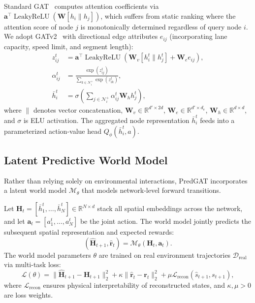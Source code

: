 \documentclass[11pt,a4paper]{article}
\begin{document}
Standard GAT~\cite{velickovic2018graph} computes attention coefficients via $\mathbf{a}^\top \operatorname{LeakyReLU}(\mathbf{W}[h_i \| h_j])$, which suffers from static ranking where the attention score of node $j$ is monotonically determined regardless of query node $i$. We adopt GATv2~\cite{brody2022gatv2} with directional edge attributes $e_{ij}$ (incorporating lane capacity, speed limit, and segment length):
\begin{align}
    z_{ij}^t &= \mathbf{a}^\top \operatorname{LeakyReLU}\left( \mathbf{W}_v [h_i^t \parallel h_j^t] + \mathbf{W}_e e_{ij} \right), \\
    \alpha_{ij}^t &= \frac{\exp(z_{ij}^t)}{\sum_{k \in \mathcal{N}_i^+} \exp(z_{ik}^t)}, \\
    \bar{h}_i^t &= \sigma\left( \sum_{j \in \mathcal{N}_i^+} \alpha_{ij}^t \mathbf{W}_h h_j^t \right),
\end{align}
where $\|$ denotes vector concatenation, $\mathbf{W}_v \in \mathbb{R}^{d' \times 2d}$, $\mathbf{W}_e \in \mathbb{R}^{d' \times d_e}$, $\mathbf{W}_h \in \mathbb{R}^{d \times d}$, and $\sigma$ is ELU activation. The aggregated node representation $\bar{h}_i^t$ feeds into a parameterized action-value head $Q_\phi(\bar{h}_i^t, a)$.

\subsection{Latent Predictive World Model}
Rather than relying solely on environmental interactions, PredGAT incorporates a latent world model $\mathcal{M}_\theta$ that models network-level forward transitions.

Let $\mathbf{H}_t = [\bar{h}_1^t, \dots, \bar{h}_N^t] \in \mathbb{R}^{N \times d}$ stack all spatial embeddings across the network, and let $\mathbf{a}_t = [a_1^t, \dots, a_N^t]$ be the joint action. The world model jointly predicts the subsequent spatial representation and expected rewards:
\begin{equation}
    (\widehat{\mathbf{H}}_{t+1}, \widehat{\mathbf{r}}_t) = \mathcal{M}_\theta(\mathbf{H}_t, \mathbf{a}_t).
\end{equation}
The world model parameters $\theta$ are trained on real environment trajectories $\mathcal{D}_{\text{real}}$ via multi-task loss:
\begin{equation}
    \mathcal{L}(\theta) = \|\widehat{\mathbf{H}}_{t+1} - \mathbf{H}_{t+1}\|_2^2 + \kappa \|\widehat{\mathbf{r}}_t - \mathbf{r}_t\|_2^2 + \mu \mathcal{L}_{\text{recon}}(\widehat{s}_{t+1}, s_{t+1}),
\end{equation}
where $\mathcal{L}_{\text{recon}}$ ensures physical interpretability of reconstructed states, and $\kappa, \mu > 0$ are loss weights.
\end{document}

